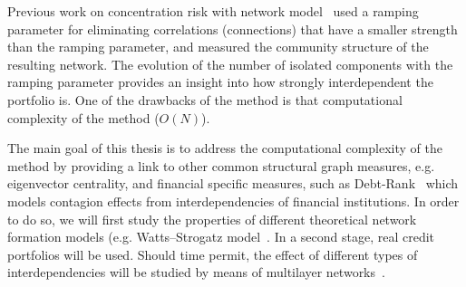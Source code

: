 \documentclass[12pt,beltcrest]{ociamthesis} %
\begin{document}
Previous work on concentration risk with network model~\citep{Sindel:2009vd} used a ramping parameter for eliminating correlations (connections) that have a smaller strength than the ramping parameter, and measured the community structure of the resulting network. The evolution of the number of isolated components with the ramping parameter provides an insight into how strongly interdependent the portfolio is. One of the drawbacks of the method is that computational complexity of the method ($O(N)$).

The main goal of this thesis is to address the computational complexity of the method by providing a link to other common structural graph measures, e.g. eigenvector centrality, and financial specific measures, such as Debt-Rank~\citep{Puliga:2012ev} which models contagion effects from interdependencies of financial institutions.
In order to do so, we will first study the properties of different theoretical network formation models (e.g. Watts–Strogatz model~\citep{Watts:1998db}.
In a second stage, real credit portfolios will be used. Should time permit, the effect of different types of interdependencies will be studied by means of multilayer networks~\citep{Kivela:2014dm}.






\appendix



\end{document}
